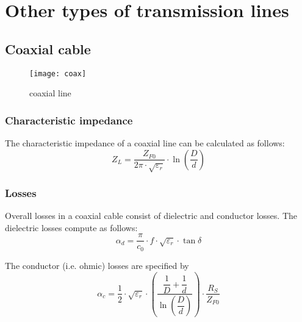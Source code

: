 %
%
%
%

\chapter{Other types of transmission lines}

\section{Coaxial cable}

\begin{figure}[ht]
\begin{center}
\texttt{[image: coax]}
\end{center}
\caption{coaxial line}
\label{fig:coax}
\end{figure}
\FloatBarrier

\subsection{Characteristic impedance}

The characteristic impedance of a coaxial line can be calculated as follows:
\begin{equation}
Z_L = \dfrac{Z_{F0}}{2\pi\cdot\sqrt{\varepsilon_r}}\cdot\ln{\left(\dfrac{D}{d}\right)}
\end{equation}

\subsection{Losses}

Overall losses in a coaxial cable consist of dielectric and conductor
losses.  The dielectric losses compute as follows:
\begin{equation}
\alpha_d = \dfrac{\pi}{c_0}\cdot f\cdot \sqrt{\varepsilon_r} \cdot \tan{\delta}
\end{equation}

The conductor (i.e. ohmic) losses are specified by
\begin{equation}
\alpha_c = \dfrac{1}{2}\cdot \sqrt{\varepsilon_r} \cdot\left(\dfrac{\dfrac{1}{D} + \dfrac{1}{d}}{\ln{\left(\dfrac{D}{d}\right)}}\right)\cdot\dfrac{R_S}{Z_{F0}}
\end{equation}


